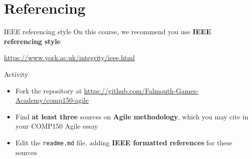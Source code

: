 \part{Referencing}
\frame{\partpage}

\begin{frame}{IEEE referencing style}
	\pause On this course, we recommend you use \textbf{IEEE referencing style}
	\pause
	\begin{center}
		\small\url{https://www.york.ac.uk/integrity/ieee.html}
	\end{center}
\end{frame}

\begin{frame}{Activity}
	\begin{itemize}
		\item Fork the repository at \url{https://github.com/Falmouth-Games-Academy/comp150-agile}
		\item Find \textbf{at least three} sources on \textbf{Agile methodology},
			which you may cite in your COMP150 Agile essay
		\item Edit the \texttt{readme.md} file, adding \textbf{IEEE formatted references} for these sources
	\end{itemize}
\end{frame}

